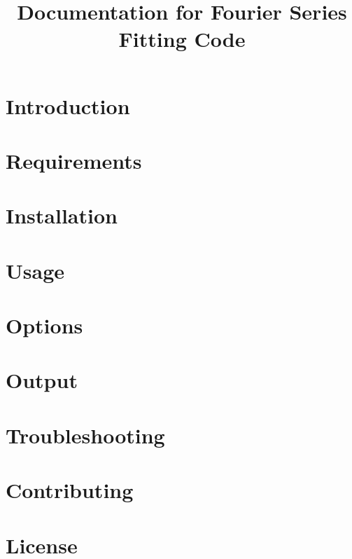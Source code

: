 \documentclass{article}
\begin{document}
\title{Documentation for Fourier Series Fitting Code}
\maketitle
\section{Introduction}

\section{Requirements}

\section{Installation}

\section{Usage}

\section{Options}

\section{Output}

\section{Troubleshooting}

\section{Contributing}

\section{License}
\end{document}
